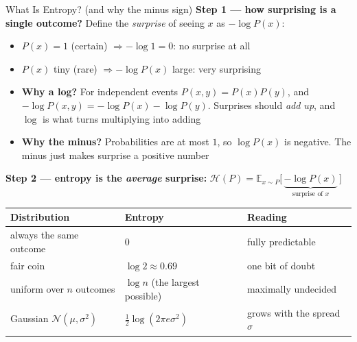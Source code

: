 \begin{frame}{What Is Entropy? (and why the minus sign)}
\small
\textbf{Step 1 --- how surprising is a single outcome?} Define the \emph{surprise} of seeing $x$ as $-\log P(x)$:
\begin{itemize}
    \item $P(x)=1$ (certain) $\Rightarrow -\log 1 = 0$: no surprise at all
    \item $P(x)$ tiny (rare) $\Rightarrow -\log P(x)$ large: very surprising
    \item \textbf{Why a log?} For independent events $P(x,y)=P(x)P(y)$, and $-\log P(x,y) = -\log P(x) - \log P(y)$. Surprises should \emph{add up}, and $\log$ is what turns multiplying into adding
    \item \textbf{Why the minus?} Probabilities are at most $1$, so $\log P(x)$ is negative. The minus just makes surprise a positive number
\end{itemize}
\vspace{0.1em}
\textbf{Step 2 --- entropy is the \emph{average} surprise:}
\hfill
$\displaystyle \mathcal{H}(P) = \mathbb{E}_{x \sim P}\!\big[\, \underbrace{-\log P(x)}_{\text{surprise of }x} \,\big]$
\hfill\mbox{}
\vspace{0.4em}
\begin{center}
\renewcommand{\arraystretch}{1.05}
\scriptsize
\begin{tabular}{@{}lll@{}}
\hline
\textbf{Distribution} & \textbf{Entropy} & \textbf{Reading} \\
\hline
always the same outcome              & $0$                              & fully predictable \\
fair coin                            & $\log 2 \approx 0.69$            & one bit of doubt \\
uniform over $n$ outcomes            & $\log n$ (the largest possible)  & maximally undecided \\
Gaussian $\mathcal{N}(\mu,\sigma^2)$ & $\tfrac12\log(2\pi e \sigma^2)$  & grows with the spread $\sigma$ \\
\hline
\end{tabular}
\end{center}
\end{frame}

